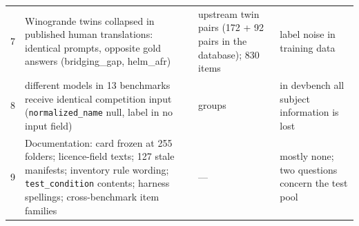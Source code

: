 \documentclass{article}
\begin{document}
\begin{table}[H]
\begin{tabular}{@{}r>{\raggedright\arraybackslash}p{5.6cm}>{\raggedright\arraybackslash}p{2.6cm}>{\raggedright\arraybackslash}p{4.2cm}@{}}
    7 & Winogrande twins collapsed in published human translations: identical prompts, opposite gold answers
        (bridging\_gap, helm\_afr) & 117 upstream twin pairs (172 + 92 pairs in the database); 830 items & label noise in training data \\
    8 & 119 different models in 13 benchmarks receive identical competition input (\texttt{normalized\_name} null,
        label in no input field) & 25 groups & in devbench all subject information is lost \\
    9 & Documentation: card frozen at 255 folders; licence-field texts; 127 stale manifests; inventory rule wording;
        \texttt{test\_condition} contents; harness spellings; cross-benchmark item families & --- & mostly none; two
        questions concern the test pool \\
    \bottomrule
  \end{tabular}
\end{table}
\end{document}
